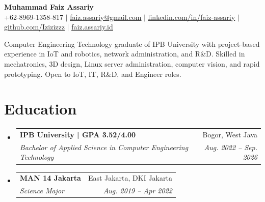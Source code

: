 \documentclass[letterpaper,11pt]{article}
\makeatletter
\newcommand{\resumeSubheading}[4]{
  \vspace{-2pt}\item
    \begin{tabular*}{0.97\textwidth}[t]{l@{\extracolsep{\fill}}r}
      \textbf{#1} & #2 \\
      \textit{\small#3} & \textit{\small #4} \\
    \end{tabular*}\vspace{-7pt}
}
\newcommand{\resumeSubHeadingListStart}{\begin{itemize}[leftmargin=0.15in, label={}]}
\newcommand{\resumeSubHeadingListEnd}{\end{itemize}}
\makeatother
\begin{document}

\begin{center}
    \textbf{\Huge Muhammad Faiz Assariy} \\ \vspace{1pt}
    \small +62-8969-1358-817 $|$ \href{mailto:faiz.assariy@gmail.com}{\underline{faiz.assariy@gmail.com}} $|$
    \href{https://linkedin.com/in/faiz-assariy}{\underline{linkedin.com/in/faiz-assariy}} $|$
    \href{https://github.com/Izizizzz}{\underline{github.com/Izizizzz}} $|$
    \href{https://faiz.assariy.id}{\underline{faiz.assariy.id}}
\end{center}

 \begin{itemize}[leftmargin=0.15in, label={}]
    \small{\item{
     Computer Engineering Technology graduate of IPB University with project-based experience in IoT and robotics, network administration, and R\&D. Skilled in mechatronics, 3D design, Linux server administration, computer vision, and rapid prototyping. Open to IoT, IT, R\&D, and Engineer roles.
    }}
 \end{itemize}

\section{Education}
  \resumeSubHeadingListStart
    \resumeSubheading
      {IPB University | GPA 3.52/4.00}{Bogor, West Java}
      {Bachelor of Applied Science in Computer Engineering Technology}{Aug. 2022 -- Sep. 2026}
    \resumeSubheading
      {MAN 14 Jakarta}{East Jakarta, DKI Jakarta}
      {Science Major}{Aug. 2019 -- Apr 2022}
  \resumeSubHeadingListEnd


\end{document}
